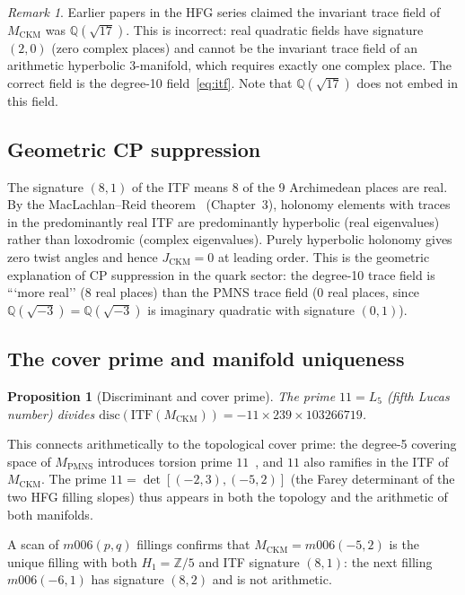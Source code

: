 \documentclass[11pt,a4paper]{article}
\newtheorem{proposition}[theorem]{Proposition}
\theoremstyle{remark}
\newtheorem{remark}[theorem]{Remark}
\newcommand{\MCKM}{M_{\mathrm{CKM}}}
\newcommand{\MPMNS}{M_{\mathrm{PMNS}}}
\newcommand{\Zfive}{\mathbb{Z}/5}
\newcommand{\QQ}{\mathbb{Q}}
\begin{document}
\begin{remark}
Earlier papers in the HFG series claimed the invariant trace field
of $\MCKM$ was $\QQ(\sqrt{17})$.
This is incorrect: real quadratic fields have signature $(2,0)$
(zero complex places) and cannot be the invariant trace field
of an arithmetic hyperbolic 3-manifold, which requires exactly
one complex place.
The correct field is the degree-10 field~\eqref{eq:itf}.
Note that $\QQ(\sqrt{17})$ does not embed in this field.
\end{remark}

\subsection{Geometric CP suppression}

The signature $(8,1)$ of the ITF means 8 of the 9 Archimedean
places are real.
By the MacLachlan--Reid theorem~\cite{MaclachlanReid} (Chapter~3),
holonomy elements with traces in the predominantly real ITF are
predominantly hyperbolic (real eigenvalues) rather than loxodromic
(complex eigenvalues).
Purely hyperbolic holonomy gives zero twist angles and hence
$J_{\mathrm{CKM}} = 0$ at leading order.
This is the geometric explanation of CP suppression in the quark
sector: the degree-10 trace field is ```more real'' (8 real places)
than the PMNS trace field (0 real places, since
$\mathbb{Q}(\sqrt{-3}) = \QQ(\sqrt{-3})$ is imaginary quadratic with signature $(0,1)$).

\subsection{The cover prime and manifold uniqueness}

\begin{proposition}[Discriminant and cover prime]
The prime $11 = L_5$ (fifth Lucas number) divides
$\mathrm{disc}(\mathrm{ITF}(\MCKM)) = -11\times239\times103266719$.
\end{proposition}

This connects arithmetically to the topological cover prime:
the degree-5 covering space of $\MPMNS$ introduces torsion prime
$11$~\cite{Gentry:Farey}, and $11$ also ramifies in the ITF of $\MCKM$.
The prime $11 = \det[(-2,3),(-5,2)]$ (the Farey determinant of the
two HFG filling slopes) thus appears in both the topology and the
arithmetic of both manifolds.

A scan of $m006(p,q)$ fillings confirms that $\MCKM = m006(-5,2)$
is the unique filling with both $H_1 = \Zfive$ and ITF signature $(8,1)$:
the next filling $m006(-6,1)$ has signature $(8,2)$ and is not arithmetic.
\end{document}
